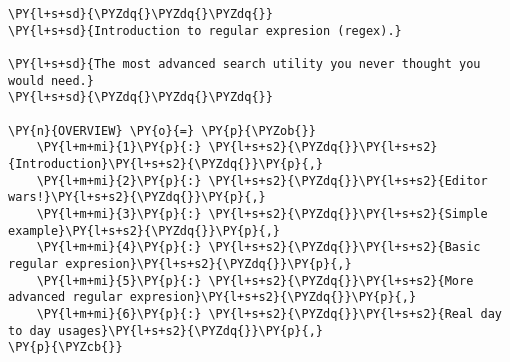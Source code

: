

\section*{}

\begin{Verbatim}[commandchars=\\\{\}]
\PY{l+s+sd}{\PYZdq{}\PYZdq{}\PYZdq{}}
\PY{l+s+sd}{Introduction to regular expresion (regex).}

\PY{l+s+sd}{The most advanced search utility you never thought you would need.}
\PY{l+s+sd}{\PYZdq{}\PYZdq{}\PYZdq{}}

\PY{n}{OVERVIEW} \PY{o}{=} \PY{p}{\PYZob{}}
    \PY{l+m+mi}{1}\PY{p}{:} \PY{l+s+s2}{\PYZdq{}}\PY{l+s+s2}{Introduction}\PY{l+s+s2}{\PYZdq{}}\PY{p}{,}
    \PY{l+m+mi}{2}\PY{p}{:} \PY{l+s+s2}{\PYZdq{}}\PY{l+s+s2}{Editor wars!}\PY{l+s+s2}{\PYZdq{}}\PY{p}{,}
    \PY{l+m+mi}{3}\PY{p}{:} \PY{l+s+s2}{\PYZdq{}}\PY{l+s+s2}{Simple example}\PY{l+s+s2}{\PYZdq{}}\PY{p}{,}
    \PY{l+m+mi}{4}\PY{p}{:} \PY{l+s+s2}{\PYZdq{}}\PY{l+s+s2}{Basic regular expresion}\PY{l+s+s2}{\PYZdq{}}\PY{p}{,}
    \PY{l+m+mi}{5}\PY{p}{:} \PY{l+s+s2}{\PYZdq{}}\PY{l+s+s2}{More advanced regular expresion}\PY{l+s+s2}{\PYZdq{}}\PY{p}{,}
    \PY{l+m+mi}{6}\PY{p}{:} \PY{l+s+s2}{\PYZdq{}}\PY{l+s+s2}{Real day to day usages}\PY{l+s+s2}{\PYZdq{}}\PY{p}{,}
\PY{p}{\PYZcb{}}
\end{Verbatim}
